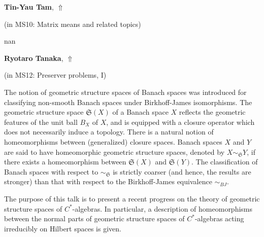 \documentclass[ILAS2025-program.tex]{subfiles}
\begin{document}
     \hypertarget{down0255}{}\begin{ilasabstract}
    
    \textbf{Tin-Yau Tam},  \hfill \hyperlink{up0255}{$\Uparrow$}
    
    (in {\color{mstitle}MS10: Matrix means and related topics})
        
        \mtskip
    nan\end{ilasabstract}
     \hypertarget{down0161}{}\begin{ilasabstract}
    
    \textbf{Ryotaro Tanaka},  \hfill \hyperlink{up0161}{$\Uparrow$}
    
    (in {\color{mstitle}MS12: Preserver problems, I})
        
        \mtskip
    The notion of geometric structure spaces of Banach spaces was introduced for classifying non-smooth Banach spaces under Birkhoff-James isomorphisms. The geometric structure space $\mathfrak{S}(X)$ of a Banach space $X$ reflects the geometric features of the unit ball $B_X$ of $X$, and is equipped with a closure operator which does not necessarily induce a topology. There is a natural notion of homeomorphisms between (generalized) closure spaces. Banach spaces $X$ and $Y$ are said to have homeomorphic geometric structure spaces, denoted by $X\sim_\mathfrak{S} Y$, if there exists a homeomorphism between $\mathfrak{S} (X)$ and $\mathfrak{S} (Y)$. The classification of Banach spaces with respect to $\sim_\mathfrak{S}$ is strictly coarser (and hence, the results are stronger) than that with respect to the Birkhoff-James equivalence $\sim_{BJ}$.

The purpose of this talk is to present a recent progress on the theory of geometric structure spaces of $C^*$-algebras. In particular, a description of homeomorphisms between the normal parts of geometric structure spaces of $C^*$-algebras acting irreducibly on Hilbert spaces is given.
\end{ilasabstract}
\end{document}
